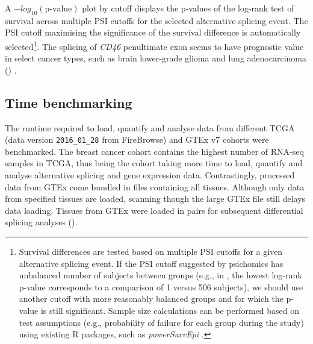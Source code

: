 A $-log_{10}(\textrm{p-value})$ plot by cutoff displays the p-values of the log-rank test of survival across multiple PSI cutoffs for the selected alternative splicing event. The PSI cutoff maximising the significance of the survival difference is automatically selected\footnote{Survival differences are tested based on multiple PSI cutoffs for a given alternative splicing event. If the PSI cutoff suggested by psichomics has unbalanced number of subjects between groups (e.g., in , the lowest log-rank p-value corresponds to a comparison of 1 versus 506 subjects), we should use another cutoff with more reasonably balanced groups and for which the p-value is still significant. Sample size calculations can be performed based on test assumptions (e.g., probability of failure for each group during the study) using existing R packages, such as \emph{powerSurvEpi} \cite{qiu:2021wd}.}. The splicing of \emph{CD46} penultimate exon seems to have prognostic value in select cancer types, such as brain lower-grade glioma and lung adenocarcinoma () .

\subsection{Time benchmarking}

The runtime required to load, quantify and analyse data from different TCGA (data version \texttt{2016\_01\_28} from FireBrowse) and GTEx v7 cohorts were benchmarked. The breast cancer cohort contains the highest number of RNA-seq samples in TCGA, thus being the cohort taking more time to load, quantify and analyse alternative splicing and gene expression data. Contrastingly, processed data from GTEx come bundled in files containing all tissues. Although only data from specified tissues are loaded, scanning though the large GTEx file still delays data loading. Tissues from GTEx were loaded in pairs for subsequent differential splicing analyses ().

